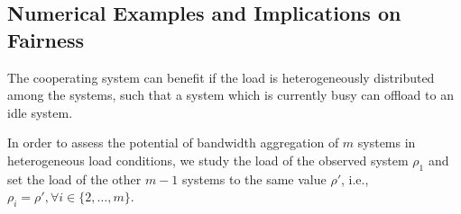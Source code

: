\subsection{Numerical Examples and Implications on Fairness}\label{sec:aggregation:imbalanced:numerical_examples}

The cooperating system can benefit if the load is heterogeneously distributed among the systems, such that a system which is currently busy can offload to an idle system.

In order to assess the potential of bandwidth aggregation of $m$ systems in heterogeneous load conditions, we study the load of the observed system $\rho_1$ and set the load of the other $m-1$ systems to the same value $\rho'$, i.e., $\rho_i=\rho',\forall i\in\{2,\dotsc,m\}$.

